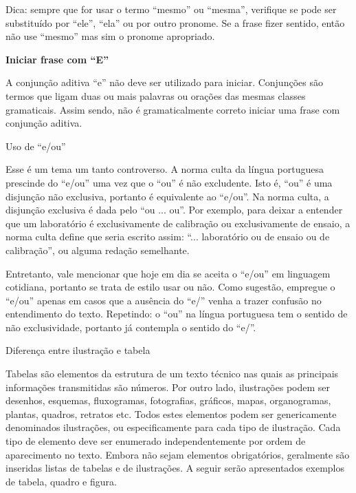 \begin{enumerate}[label=\alph*)]
Dica: sempre que for usar o termo “mesmo” ou “mesma”, verifique se pode ser substituído por “ele”, “ela” ou por outro pronome. Se a frase fizer sentido, então não use “mesmo” mas sim o pronome apropriado.
\item {\bfseries Iniciar frase com “E”}

A conjunção aditiva “e” não deve ser utilizado para iniciar. Conjunções são termos que ligam duas ou mais palavras ou orações das mesmas classes gramaticais. Assim sendo, não é gramaticalmente correto iniciar uma frase com conjunção aditiva.

{\bfseries \item  Uso de “e/ou”}

Esse é um tema um tanto controverso. A norma culta da língua portuguesa prescinde do “e/ou” uma vez que o “ou” é não excludente. Isto é, “ou” é uma disjunção não exclusiva, portanto é equivalente ao “e/ou”. Na norma culta, a disjunção exclusiva é dada pelo “ou ... ou”. Por exemplo, para deixar a entender que um laboratório é exclusivamente de calibração ou exclusivamente de ensaio, a norma culta define que seria escrito assim: “... laboratório ou de ensaio ou de calibração”, ou alguma redação semelhante.

Entretanto, vale mencionar que hoje em dia se aceita o “e/ou” em linguagem cotidiana, portanto se trata de estilo usar ou não. Como sugestão, empregue o “e/ou” apenas em casos que a ausência do “e/” venha a trazer confusão no entendimento do texto. Repetindo: o “ou” na língua portuguesa tem o sentido de não exclusividade, portanto já contempla o sentido do “e/”.

{\bfseries \item  Diferença entre ilustração e tabela}

Tabelas são elementos da estrutura de um texto técnico nas quais as principais informações transmitidas são números. Por outro lado, ilustrações podem ser desenhos, esquemas, fluxogramas, fotografias, gráficos, mapas, organogramas, plantas, quadros, retratos etc. Todos estes elementos podem ser genericamente denominados ilustrações, ou especificamente para cada tipo de ilustração. Cada tipo de elemento deve ser enumerado independentemente por ordem de aparecimento no texto. Embora não sejam elementos obrigatórios, geralmente são inseridas listas de tabelas e de ilustrações. A seguir serão apresentados exemplos de tabela, quadro e figura.




\begin{table}[!ht]
		\centering
		\IBGEtab{}{
		
}
\end{table}
\end{enumerate}
